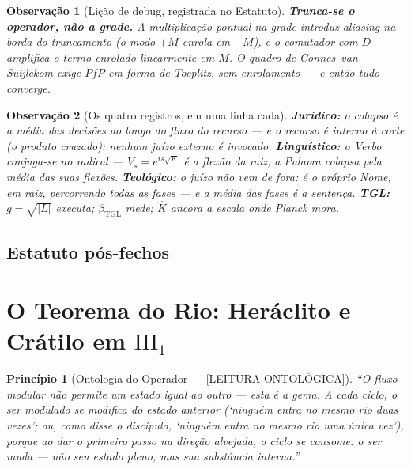 \documentclass[11pt,a4paper]{article}
\newcommand{\ONTO}{\textsf{[LEITURA ONTOLÓGICA]}}
\newcommand{\bTGL}{\beta_{\mathrm{TGL}}}
\newtheorem{remark}{Observação}
\newtheorem{principle}{Princípio}
\begin{document}
\begin{remark}[Lição de debug, registrada no Estatuto]
\textbf{Trunca-se o operador, não a grade.} A multiplicação pontual na
grade introduz \emph{aliasing} na borda do truncamento (o modo $+M$
enrola em $-M$), e o comutador com $D$ amplifica o termo enrolado
linearmente em $M$. O quadro de Connes--van Suijlekom exige $PfP$ em
forma de Toeplitz, sem enrolamento --- e então tudo converge.
\end{remark}

\begin{remark}[Os quatro registros, em uma linha cada]
\textbf{Jurídico:} o colapso é a média das decisões ao longo do fluxo do
recurso --- e o recurso é interno à corte (o produto cruzado): nenhum
juízo externo é invocado. \textbf{Linguístico:} o Verbo conjuga-se no
radical --- $V_s=e^{is\sqrt K}$ é a flexão da raiz; a Palavra colapsa
pela média das suas flexões. \textbf{Teológico:} o juízo não vem de
fora: é o próprio Nome, em raiz, percorrendo todas as fases --- e a
média das fases é a sentença. \textbf{TGL:} $g=\sqrt{|L|}$ executa;
$\bTGL$ mede; $\hat K$ ancora a escala onde Planck mora.
\end{remark}

\subsection{Estatuto pós-fechos}
\begin{center}
\end{center}

\section{O Teorema do Rio: Heráclito e Crátilo em $\mathrm{III}_1$}
\label{sec:rio}
\begin{principle}[Ontologia do Operador --- \ONTO]
``O fluxo modular não permite um estado igual ao outro --- esta é a
gema. A cada ciclo, o ser modulado se modifica do estado anterior
(`ninguém entra no mesmo rio duas vezes'; ou, como disse o discípulo,
`ninguém entra no mesmo rio \emph{uma única} vez'), porque ao dar o
primeiro passo na direção alvejada, o ciclo se consome: o ser muda ---
não seu estado pleno, mas sua substância interna.''
\end{principle}
\end{document}
